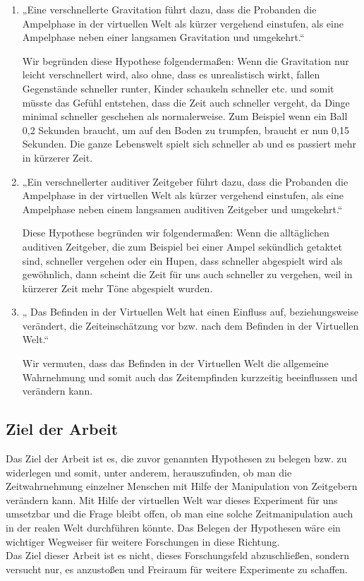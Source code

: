 \documentclass{Paper}
\begin{document}
\begin{enumerate}
\item „Eine verschnellerte Gravitation führt dazu, dass die Probanden die Ampelphase in der virtuellen Welt als kürzer vergehend einstufen, als eine Ampelphase neben einer langsamen Gravitation und umgekehrt.“
\par
Wir begründen diese Hypothese folgendermaßen: Wenn die Gravitation nur leicht verschnellert wird, also ohne, dass es unrealistisch wirkt, fallen Gegenstände schneller runter, Kinder schaukeln schneller etc. und somit müsste das Gefühl entstehen, dass die Zeit auch schneller vergeht, da Dinge minimal schneller geschehen als normalerweise. Zum Beispiel wenn ein Ball 0,2 Sekunden braucht, um auf den Boden zu trumpfen, braucht er nun 0,15 Sekunden. Die ganze Lebenswelt spielt sich schneller ab und es passiert mehr in kürzerer Zeit. 
\item „Ein verschnellerter auditiver Zeitgeber führt dazu, dass die Probanden die Ampelphase in der virtuellen Welt als kürzer vergehend einstufen, als eine Ampelphase neben einem langsamen auditiven Zeitgeber und umgekehrt.“ 
\par
Diese Hypothese begründen wir folgendermaßen: Wenn die alltäglichen auditiven Zeitgeber, die zum Beispiel bei einer Ampel sekündlich getaktet sind, schneller vergehen oder ein Hupen, dass schneller abgespielt wird als gewöhnlich, dann scheint die Zeit für uns auch schneller zu vergehen, weil in kürzerer Zeit mehr Töne abgespielt wurden. 
\item „ Das Befinden in der Virtuellen Welt hat einen Einfluss auf, beziehungsweise verändert, die Zeiteinschätzung vor bzw. nach dem Befinden in der Virtuellen Welt.“
\par
 Wir vermuten, dass das Befinden in der Virtuellen Welt die allgemeine Wahrnehmung und somit auch das Zeitempfinden kurzzeitig beeinflussen und verändern kann. 
\end{enumerate}

\subsection{Ziel der Arbeit}
Das Ziel der Arbeit ist es, die zuvor genannten Hypothesen zu belegen bzw. zu widerlegen und somit, unter anderem, herauszufinden, ob man die Zeitwahrnehmung einzelner Menschen mit Hilfe der Manipulation von Zeitgebern verändern kann. Mit Hilfe der virtuellen Welt war dieses Experiment für uns umsetzbar und die Frage bleibt offen, ob man eine solche Zeitmanipulation auch in der realen Welt durchführen könnte. Das Belegen der Hypothesen wäre ein wichtiger Wegweiser für weitere Forschungen in diese Richtung.\\
Das Ziel dieser Arbeit ist es nicht, dieses Forschungsfeld abzuschließen, sondern versucht nur, es anzustoßen und Freiraum für weitere Experimente zu schaffen.
\end{document}
